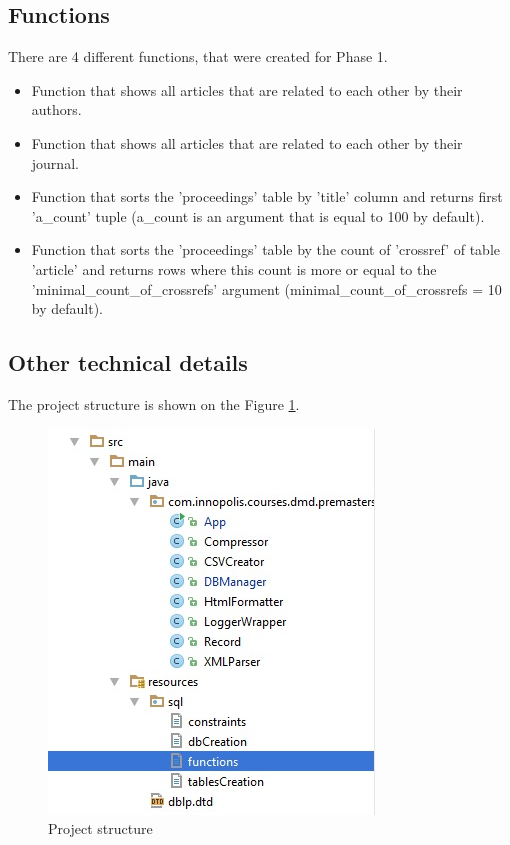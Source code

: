 \documentclass{acm_proc_article-sp}
\begin{document}
\subsection{Functions}
There are 4 different functions, that were created for Phase 1.
\begin{itemize}
	\item Function that shows all articles that are related to each other by their authors.
	\item Function that shows all articles that are related to each other by their journal.
	\item Function that sorts the 'proceedings' table by 'title' column and returns first 'a\_count' tuple (a\_count is an argument that is equal to 100 by default).
	\item Function that sorts the 'proceedings' table by the count of 'crossref' of table 'article' and returns rows where this count is more or equal to the 'minimal\_count\_of\_crossrefs' argument (minimal\_count\_of\_crossrefs = 10 by default).
\end{itemize}
\subsection{Other technical details}

The project structure is shown on the Figure \ref{fig:ProjectStructure}. 

\begin{figure}[h]
	\centering
	\includegraphics[width=0.7\linewidth]{ProjectStructure}
	\caption{Project structure}
	\label{fig:ProjectStructure}
\end{figure}
\end{document}
